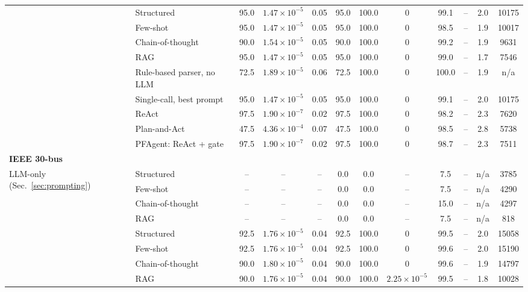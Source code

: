 \begin{table}[!ht]
{\begin{tabular}{ll cccc cc cc cc}
\addlinespace
\multirow{4}{*}{Single-call (Sec.~\ref{sec:prompting})} & Structured & 95.0 & $1.47{\times}10^{-5}$ & 0.05 & 95.0 & 100.0 & 0 & 99.1 & -- & 2.0 & 10175 \\
 & Few-shot & 95.0 & $1.47{\times}10^{-5}$ & 0.05 & 95.0 & 100.0 & 0 & 98.5 & -- & 1.9 & 10017 \\
 & Chain-of-thought & 90.0 & $1.54{\times}10^{-5}$ & 0.05 & 90.0 & 100.0 & 0 & 99.2 & -- & 1.9 & 9631 \\
 & RAG & 95.0 & $1.47{\times}10^{-5}$ & 0.05 & 95.0 & 100.0 & 0 & 99.0 & -- & 1.7 & 7546 \\
\addlinespace
\multirow{5}{*}{Architectures (Sec.~\ref{sec:agents})} & Rule-based parser, no LLM & 72.5 & $1.89{\times}10^{-5}$ & 0.06 & 72.5 & 100.0 & 0 & 100.0 & -- & 1.9 & n/a \\
 & Single-call, best prompt & 95.0 & $1.47{\times}10^{-5}$ & 0.05 & 95.0 & 100.0 & 0 & 99.1 & -- & 2.0 & 10175 \\
 & ReAct & 97.5 & $1.90{\times}10^{-7}$ & 0.02 & 97.5 & 100.0 & 0 & 98.2 & -- & 2.3 & 7620 \\
 & Plan-and-Act & 47.5 & $4.36{\times}10^{-4}$ & 0.07 & 47.5 & 100.0 & 0 & 98.5 & -- & 2.8 & 5738 \\
 & PFAgent: ReAct + gate & 97.5 & $1.90{\times}10^{-7}$ & 0.02 & 97.5 & 100.0 & 0 & 98.7 & -- & 2.3 & 7511 \\
\midrule
\multicolumn{12}{l}{\textbf{IEEE 30-bus}} \\
\multirow{4}{*}{LLM-only (Sec.~\ref{sec:prompting})} & Structured & -- & -- & -- & 0.0 & 0.0 & -- & 7.5 & -- & n/a & 3785 \\
 & Few-shot & -- & -- & -- & 0.0 & 0.0 & -- & 7.5 & -- & n/a & 4290 \\
 & Chain-of-thought & -- & -- & -- & 0.0 & 0.0 & -- & 15.0 & -- & n/a & 4297 \\
 & RAG & -- & -- & -- & 0.0 & 0.0 & -- & 7.5 & -- & n/a & 818 \\
\addlinespace
\multirow{4}{*}{Single-call (Sec.~\ref{sec:prompting})} & Structured & 92.5 & $1.76{\times}10^{-5}$ & 0.04 & 92.5 & 100.0 & 0 & 99.5 & -- & 2.0 & 15058 \\
 & Few-shot & 92.5 & $1.76{\times}10^{-5}$ & 0.04 & 92.5 & 100.0 & 0 & 99.6 & -- & 2.0 & 15190 \\
 & Chain-of-thought & 90.0 & $1.80{\times}10^{-5}$ & 0.04 & 90.0 & 100.0 & 0 & 99.6 & -- & 1.9 & 14797 \\
 & RAG & 90.0 & $1.76{\times}10^{-5}$ & 0.04 & 90.0 & 100.0 & $2.25{\times}10^{-5}$ & 99.5 & -- & 1.8 & 10028 \\

\end{tabular}}
\end{table}
